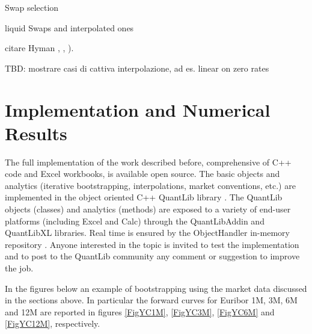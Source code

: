 \documentclass[11pt,reqno]{amsart}
\begin{document}
Swap selection

liquid Swaps and interpolated ones

citare Hyman \cite{Hym1983}, \cite{HagWes06}, \cite{HagWes08}).

TBD: mostrare casi di cattiva interpolazione, ad es. linear on zero rates


\section{Implementation and Numerical Results}
\label{sec:ImplementResults}
The full implementation of the work described before, comprehensive of C++ code and Excel workbooks, is available open source. The basic objects and analytics (iterative bootstrapping, interpolations, market conventions, etc.) are implemented in the object oriented C++ QuantLib library \cite{QuantLib}. The QuantLib objects (classes) and analytics (methods) are exposed to a variety of end-user platforms (including Excel and Calc) through the QuantLibAddin \cite{QuantLibAddin} and QuantLibXL \cite{QuantLibXL} libraries. Real time is ensured by the ObjectHandler in-memory repository \cite{ObjectHandler}.
Anyone interested in the topic is invited to test the implementation and to post to the QuantLib community any comment or suggestion to improve the job.
\par
In the figures below an example of bootstrapping using the market data discussed in the sections above. In particular the forward curves for Euribor 1M, 3M, 6M and 12M are reported in figures \ref{FigYC1M}, \ref{FigYC3M}, \ref{FigYC6M} and \ref{FigYC12M}, respectively.
\end{document}
